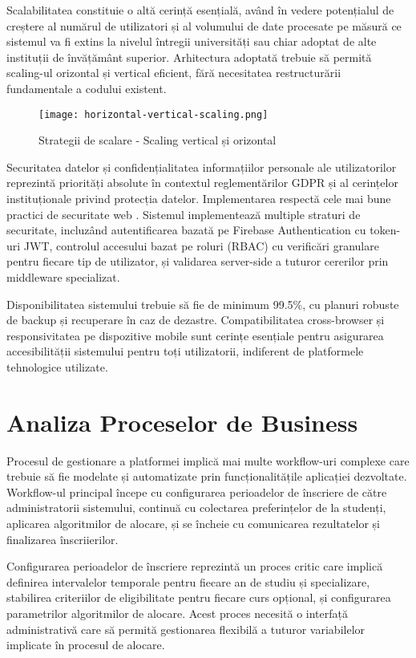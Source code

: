 \documentclass[12pt,a4paper]{report}
\begin{document}
Scalabilitatea constituie o altă cerință esențială, având în vedere potențialul de creștere al numărul de utilizatori și al volumului de date procesate pe măsură ce sistemul va fi extins la nivelul întregii universități sau chiar adoptat de alte instituții de învățământ superior. Arhitectura adoptată trebuie să permită scaling-ul orizontal și vertical eficient, fără necesitatea restructurării fundamentale a codului existent.

\begin{figure}[H]
\centering
\texttt{[image: horizontal-vertical-scaling.png]}
\caption{Strategii de scalare - Scaling vertical și orizontal}
\label{fig:scaling-strategies}
\end{figure}

Securitatea datelor și confidențialitatea informațiilor personale ale utilizatorilor reprezintă priorități absolute în contextul reglementărilor GDPR și al cerințelor instituționale privind protecția datelor. Implementarea respectă cele mai bune practici de securitate web \cite{owasp-top10}. Sistemul implementează multiple straturi de securitate, incluzând autentificarea bazată pe Firebase Authentication cu token-uri JWT, controlul accesului bazat pe roluri (RBAC) cu verificări granulare pentru fiecare tip de utilizator, și validarea server-side a tuturor cererilor prin middleware specializat.


Disponibilitatea sistemului trebuie să fie de minimum 99.5\%, cu planuri robuste de backup și recuperare în caz de dezastre. Compatibilitatea cross-browser și responsivitatea pe dispozitive mobile sunt cerințe esențiale pentru asigurarea accesibilității sistemului pentru toți utilizatorii, indiferent de platformele tehnologice utilizate.

\section{Analiza Proceselor de Business}

Procesul de gestionare a platformei implică mai multe workflow-uri complexe care trebuie să fie modelate și automatizate prin funcționalitățile aplicației dezvoltate. Workflow-ul principal începe cu configurarea perioadelor de înscriere de către administratorii sistemului, continuă cu colectarea preferințelor de la studenți, aplicarea algoritmilor de alocare, și se încheie cu comunicarea rezultatelor și finalizarea înscriierilor.

Configurarea perioadelor de înscriere reprezintă un proces critic care implică definirea intervalelor temporale pentru fiecare an de studiu și specializare, stabilirea criteriilor de eligibilitate pentru fiecare curs opțional, și configurarea parametrilor algoritmilor de alocare. Acest proces necesită o interfață administrativă care să permită gestionarea flexibilă a tuturor variabilelor implicate în procesul de alocare.
\end{document}
